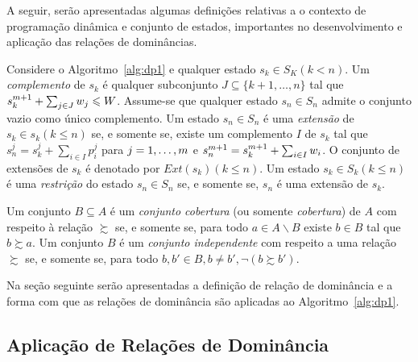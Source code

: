 A seguir, serão apresentadas algumas definições relativas
a o contexto de programação dinâmica e conjunto de estados,
importantes no desenvolvimento e aplicação das relações de dominâncias.


\begin{mydef}
Considere o Algoritmo~\ref{alg:dp1} e qualquer estado $s_k \in S_K (k < n)$.
Um \emph{complemento} de $s_k$ é qualquer subconjunto  $J \subseteq \{k+1, \ldots, n\}$
tal que $s_k^{m+1} + \sum_{j \in J} w_j \leqslant W$.
Assume-se que qualquer estado $s_n \in S_n$ admite o conjunto vazio como único complemento.
Um estado $s_n \in S_n$ é uma \emph{extensão} de $s_k \in s_k (k \leq n )$ se, e somente se,
existe um complemento $I$ de $s_k$ tal que $s_n^j = s_k^j + \sum_{i \in I} p_i^j$
para $j = 1, \ldots, m $
e $s_n^{m+1} = s_k^{m+1} + \sum_{i \in I} w_i$.
O conjunto de extensões de $s_k$ é denotado por $Ext(s_k) (k \leq n)$.
Um estado $s_k \in S_k (k \leq n)$ é uma \emph{restrição} do estado $s_n \in S_n$
se, e somente se, $s_n$ é uma extensão de $s_k$.
\end{mydef}

\begin{mydef}
  Um conjunto $B \subseteq A$ é um \emph{conjunto cobertura} (ou somente \emph{cobertura})
  de $A$ com respeito à relação $\succsim$ se, e somente se, para todo
  $a \in A \backslash B$ existe $b \in B$ tal que $b \succsim a$.
  Um conjunto $B$ é um \emph{conjunto independente} com respeito a
  uma relação $\succsim$ se, e somente se, para todo $b, b' \in B, b \neq b', \neg ( b \succsim b')$.
\end{mydef}

Na seção seguinte serão apresentadas a definição de relação de dominância e a forma com que as relações
de dominância são aplicadas ao Algoritmo~\ref{alg:dp1}.

\subsection{Aplicação de Relações de Dominância}
\label{sec:domrel}

